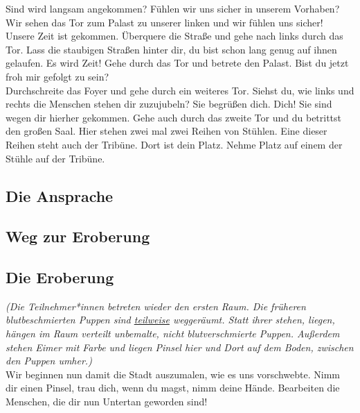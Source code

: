 \documentclass[a4paper, 12pt]{report}
\begin{document}
Sind wird langsam angekommen? 
Fühlen wir uns sicher in unserem Vorhaben?
Wir sehen das Tor zum Palast zu unserer linken und wir fühlen uns sicher! 
Unsere Zeit ist gekommen.
Überquere die Straße und gehe nach links durch das Tor. 
Lass die staubigen Straßen hinter dir, du bist schon lang genug auf ihnen gelaufen. 
Es wird Zeit!
Gehe durch das Tor und betrete den Palast.
Bist du jetzt froh mir gefolgt zu sein? \\

Durchschreite das Foyer und gehe durch ein weiteres Tor.
Siehst du, wie links und rechts die Menschen stehen dir zuzujubeln?
Sie begrüßen dich. Dich! Sie sind wegen dir hierher gekommen.
Gehe auch durch das zweite Tor und du betrittst den großen Saal. 
Hier stehen zwei mal zwei Reihen von Stühlen. 
Eine dieser Reihen steht auch der Tribüne. 
Dort ist dein Platz. 
Nehme Platz auf einem der Stühle auf der Tribüne.

\subsection{Die Ansprache}

\subsection{Weg zur Eroberung}

\subsection{Die Eroberung}
\textit{(Die Teilnehmer*innen betreten wieder den ersten Raum. 
Die früheren blutbeschmierten Puppen sind \hyperref[zahl_der_puppen]{teilweise} weggeräumt.
Statt ihrer stehen, liegen, hängen im Raum verteilt unbemalte, nicht blutverschmierte Puppen.
Außerdem stehen Eimer mit Farbe und liegen Pinsel hier und Dort auf dem Boden, zwischen den Puppen umher.)}\\

Wir beginnen nun damit die Stadt auszumalen, wie es uns vorschwebte.
Nimm dir einen Pinsel, trau dich, wenn du magst, nimm deine Hände. 
Bearbeiten die Menschen, die dir nun Untertan geworden sind!\\
\end{document}
